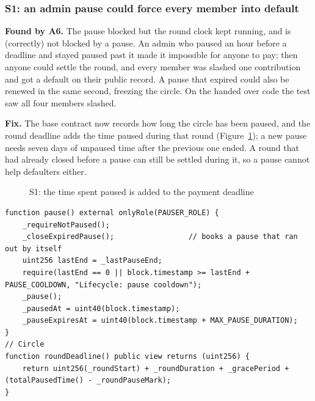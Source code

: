 \subsubsection{S1: an admin pause could force every member into default}
\label{sec:s1}
\textbf{Found by A6.} The pause blocked  but the round clock kept running, and
 is (correctly) not blocked by a pause. An admin who paused an hour before a deadline
and stayed paused past it made it impossible for anyone to pay; then anyone could settle the round, and
every member was slashed one contribution and got a default on their public record. A pause that
expired could also be renewed in the same second, freezing the circle. On the handed over code the test
saw all four members slashed.

\textbf{Fix.} The base contract now records how long the circle has been paused, and the round deadline
adds the time paused during that round (Figure~\ref{fig:s1}); a new pause needs seven days of unpaused
time after the previous one ended. A round that had already closed before a pause can still be settled
during it, so a pause cannot help defaulters either.

\begin{figure}[H]
\centering
{}
\caption{S1: the time spent paused is added to the payment deadline}
\label{fig:s1}
\end{figure}

\begin{lstlisting}[language=Solidity]
function pause() external onlyRole(PAUSER_ROLE) {
    _requireNotPaused();
    _closeExpiredPause();                 // books a pause that ran out by itself
    uint256 lastEnd = _lastPauseEnd;
    require(lastEnd == 0 || block.timestamp >= lastEnd + PAUSE_COOLDOWN, "Lifecycle: pause cooldown");
    _pause();
    _pausedAt = uint40(block.timestamp);
    _pauseExpiresAt = uint40(block.timestamp + MAX_PAUSE_DURATION);
}
// Circle
function roundDeadline() public view returns (uint256) {
    return uint256(_roundStart) + _roundDuration + _gracePeriod + (totalPausedTime() - _roundPauseMark);
}
\end{lstlisting}

